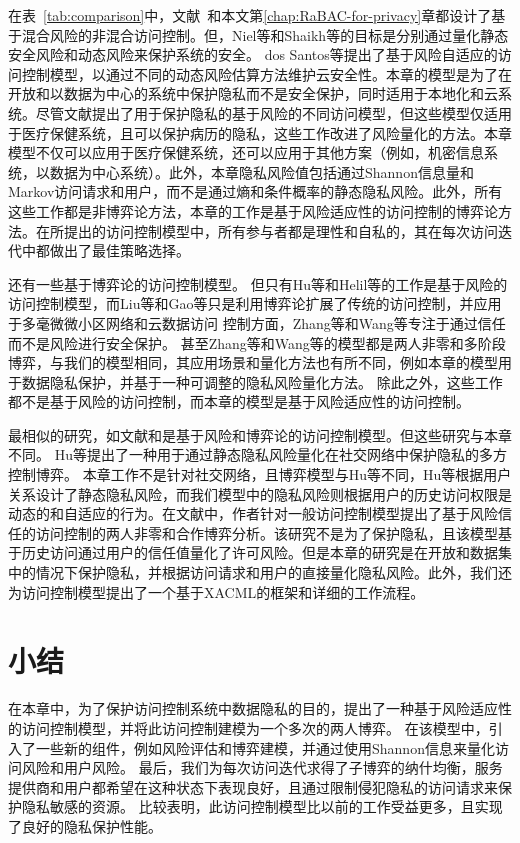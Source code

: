 在表~\ref{tab:comparison}中，文献~\cite{ni2010risk,shaikh2012dynamic,santos2016framework,wang2011quantified,zhang2018privacy,zhen2015risk}和本文第\ref{chap:RaBAC-for-privacy}章都设计了基于混合风险的非混合访问控制。但，Niel等\cite{ni2010risk}和Shaikh等\cite{shaikh2012dynamic}的目标是分别通过量化静态安全风险和动态风险来保护系统的安全。 dos Santos等\cite{santos2016framework}提出了基于风险自适应的访问控制模型，以通过不同的动态风险估算方法维护云安全性。本章的模型是为了在开放和以数据为中心的系统中保护隐私而不是安全保护，同时适用于本地化和云系统。尽管文献\cite{wang2011quantified,zhen2015risk,zhang2018privacy}提出了用于保护隐私的基于风险的不同访问模型，但这些模型仅适用于医疗保健系统，且可以保护病历的隐私，这些工作改进了风险量化的方法。本章模型不仅可以应用于医疗保健系统，还可以应用于其他方案（例如，机密信息系统，以数据为中心系统）。此外，本章隐私风险值包括通过Shannon信息量和Markov访问请求和用户，而不是通过熵\cite{zhen2015risk}和条件概率\cite{zhang2018privacy}的静态隐私风险\cite{wang2011quantified}。此外，所有这些工作都是非博弈论方法，本章的工作是基于风险适应性的访问控制的博弈论方法。在所提出的访问控制模型中，所有参与者都是理性和自私的，其在每次访问迭代中都做出了最佳策略选择。


还有一些基于博弈论的访问控制模型\cite{liu2016dynamic,gao2018game,zhang2015towards,wang2019game,hu2014game,helil2017non}。 但只有Hu等\cite{hu2014game}和Helil等\cite{helil2017non}的工作是基于风险的访问控制模型，而Liu等\cite{liu2016dynamic}和Gao等\cite{gao2018game}只是利用博弈论扩展了传统的访问控制，并应用于多毫微微小区网络和云数据访问 控制方面，Zhang等\cite{zhang2015towards}和Wang等\cite{wang2019game}专注于通过信任而不是风险进行安全保护。 甚至Zhang等和Wang等的模型都是两人非零和多阶段博弈，与我们的模型相同，其应用场景和量化方法也有所不同，例如本章的模型用于数据隐私保护，并基于一种可调整的隐私风险量化方法。 除此之外，这些工作\cite{liu2016dynamic,gao2018game,zhang2015towards,wang2019game}都不是基于风险的访问控制，而本章的模型是基于风险适应性的访问控制。

最相似的研究，如文献\cite{hu2014game}和\cite{helil2017non}是基于风险和博弈论的访问控制模型。但这些研究与本章不同。 Hu等\cite{hu2014game}提出了一种用于通过静态隐私风险量化在社交网络中保护隐私的多方控制博弈。
本章工作不是针对社交网络，且博弈模型与Hu等\cite{hu2014game}不同，Hu等\cite{hu2014game}根据用户关系设计了静态隐私风险，而我们模型中的隐私风险则根据用户的历史访问权限是动态的和自适应的行为。在文献\cite{helil2017non}中，作者针对一般访问控制模型提出了基于风险信任的访问控制的两人非零和合作博弈分析。该研究不是为了保护隐私，且该模型基于历史访问通过用户的信任值量化了许可风险。但是本章的研究是在开放和数据集中的情况下保护隐私，并根据访问请求和用户的直接量化隐私风险。此外，我们还为访问控制模型提出了一个基于XACML的框架和详细的工作流程。

\section{小结}\label{sec:conclusions}

在本章中，为了保护访问控制系统中数据隐私的目的，提出了一种基于风险适应性的访问控制模型，并将此访问控制建模为一个多次的两人博弈。 在该模型中，引入了一些新的组件，例如风险评估和博弈建模，并通过使用Shannon信息来量化访问风险和用户风险。 最后，我们为每次访问迭代求得了子博弈的纳什均衡，服务提供商和用户都希望在这种状态下表现良好，且通过限制侵犯隐私的访问请求来保护隐私敏感的资源。 比较表明，此访问控制模型比以前的工作受益更多，且实现了良好的隐私保护性能。